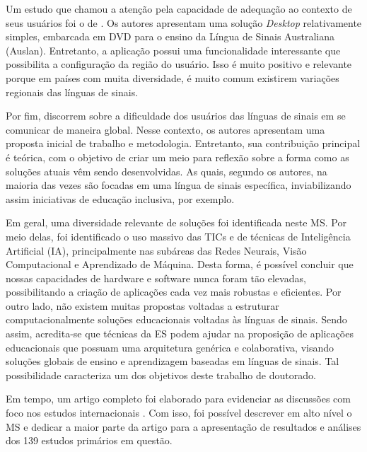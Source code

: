 Um estudo que chamou a atenção pela capacidade de adequação ao contexto de seus usuários foi o de . Os autores apresentam uma solução \textit{Desktop} relativamente simples, embarcada em DVD para o ensino da Língua de Sinais Australiana (Auslan). Entretanto, a aplicação possui uma funcionalidade interessante que possibilita a configuração da região do usuário. Isso é muito positivo e relevante porque em países com muita diversidade, é muito comum existirem variações regionais das línguas de sinais.

Por fim,  discorrem sobre a dificuldade dos usuários das línguas de sinais em se comunicar de maneira global. Nesse contexto, os autores apresentam uma proposta inicial de trabalho e metodologia. Entretanto, sua contribuição principal é teórica, com o objetivo de criar um meio para reflexão sobre a forma como as soluções atuais vêm sendo desenvolvidas. As quais, segundo os autores, na maioria das vezes são focadas em uma língua de sinais específica, inviabilizando assim iniciativas de educação inclusiva, por exemplo.

Em geral, uma diversidade relevante de soluções foi identificada neste MS. Por meio delas, foi identificado o uso massivo das TICs e de técnicas de Inteligência Artificial (IA), principalmente nas subáreas das Redes Neurais, Visão Computacional e Aprendizado de Máquina. Desta forma, é possível concluir que nossas capacidades de hardware e software nunca foram tão elevadas, possibilitando a criação de aplicações cada vez mais robustas e eficientes. Por outro lado, não existem muitas propostas voltadas a estruturar computacionalmente soluções educacionais voltadas às línguas de sinais. Sendo assim, acredita-se que técnicas da ES podem ajudar na proposição de aplicações educacionais que possuam uma arquitetura genérica e colaborativa, visando soluções globais de ensino e aprendizagem baseadas em línguas de sinais. Tal possibilidade caracteriza um dos objetivos deste trabalho de doutorado.



Em tempo, um artigo completo foi elaborado para evidenciar as discussões com foco nos estudos internacionais \cite{FalvoJr2020_FIE}. Com isso, foi possível descrever em alto nível o MS e dedicar a maior parte da artigo para a apresentação de resultados e análises dos 139 estudos primários em questão.

